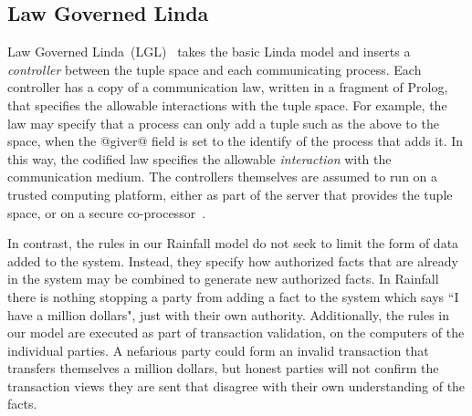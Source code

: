 \subsection{Law Governed Linda}
Law Governed Linda~(LGL)~\cite{Minsky1994:LawGovernedLinda, Minsky2001:SafeTupleSpace} takes the basic Linda model and inserts a \emph{controller} between the tuple space and each communicating process. Each controller has a copy of a communication law, written in a fragment of Prolog, that specifies the allowable interactions with the tuple space. For example, the law may specify that a process can only add a tuple such as the above to the space, when the @giver@ field is set to the identify of the process that adds it. In this way, the codified law specifies the allowable \emph{interaction} with the communication medium. The controllers themselves are assumed to run on a trusted computing platform, either as part of the server that provides the tuple space, or on a secure co-processor~\cite{Minsky2001:SafeTupleSpace}.

In contrast, the rules in our Rainfall model do not seek to limit the form of data added to the system. Instead, they specify how authorized facts that are already in the system may be combined to generate new authorized facts. In Rainfall there is nothing stopping a party from adding a fact to the system which says ``I have a million dollars", just with their own authority. Additionally, the rules in our model are executed as part of transaction validation, on the computers of the individual parties. A nefarious party could form an invalid transaction that transfers themselves a million dollars, but honest parties will not confirm the transaction views they are sent that disagree with their own understanding of the facts.


